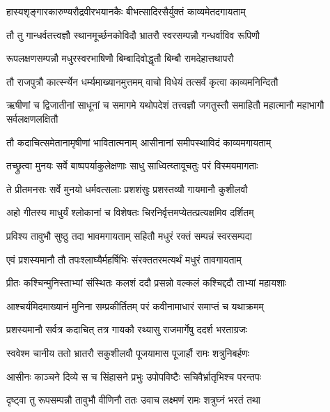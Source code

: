 \twolineshloka
{हास्यशृङ्गारकारुण्यरौद्रवीरभयानकैः}
{बीभत्सादिरसैर्युक्तं काव्यमेतदगायताम्} %

\twolineshloka
{तौ तु गान्धर्वतत्त्वज्ञौ स्थानमूर्च्छनकोविदौ}
{भ्रातरौ स्वरसम्पन्नौ गन्धर्वाविव रूपिणौ} %

\twolineshloka
{रूपलक्षणसम्पन्नौ मधुरस्वरभाषिणौ}
{बिम्बादिवोद्धृतौ बिम्बौ रामदेहात्तथापरौ} %

\twolineshloka
{तौ राजपुत्रौ कार्त्स्न्येन धर्म्यमाख्यानमुत्तमम्}
{वाचो विधेयं तत्सर्वं कृत्वा काव्यमनिन्दितौ} %

\threelineshloka
{ऋषीणां च द्विजातीनां साधूनां च समागमे}
{यथोपदेशं तत्त्वज्ञौ जगतुस्तौ समाहितौ}
{महात्मानौ महाभागौ सर्वलक्षणलक्षितौ} %

\twolineshloka
{तौ कदाचित्समेतानामृषीणां भावितात्मनाम्}
{आसीनानां समीपस्थाविदं काव्यमगायताम्} %

\twolineshloka
{तच्छ्रुत्वा मुनयः सर्वे बाष्पपर्याकुलेक्षणाः}
{साधु साध्वित्य्तावूचतुः परं विस्मयमागताः} %

\twolineshloka
{ते प्रीतमनसः सर्वे मुनयो धर्मवत्सलाः}
{प्रशशंसुः प्रशस्तव्यौ गायमानौ कुशीलवौ} %

\twolineshloka
{अहो गीतस्य माधुर्यं श्लोकानां च विशेषतः}
{चिरनिर्वृत्तमप्येतत्प्रत्यक्षमिव दर्शितम्} %

\twolineshloka
{प्रविश्य तावुभौ सुष्ठु तदा भावमगायताम्}
{सहितौ मधुरं रक्तं सम्पन्नं स्वरसम्पदा} %

\twolineshloka
{एवं प्रशस्यमानौ तौ तपःश्लाघ्यैर्महर्षिभिः}
{संरक्ततरमत्यर्थं मधुरं तावगायताम्} %

\twolineshloka
{प्रीतः कश्चिन्मुनिस्ताभ्यां संस्थितः कलशं ददौ}
{प्रसन्नो वल्कलं कश्चिद्ददौ ताभ्यां महायशाः} %

\twolineshloka
{आश्चर्यमिदमाख्यानं मुनिना सम्प्रकीर्तितम्}
{परं कवीनामाधारं समाप्तं च यथाक्रमम्} %

\twolineshloka
{प्रशस्यमानौ सर्वत्र कदाचित् तत्र गायकौ}
{रथ्यासु राजमार्गेषु ददर्श भरताग्रजः} %

\twolineshloka
{स्ववेश्म चानीय ततो भ्रातरौ सकुशीलवौ}
{पूजयामास पूजार्हौ रामः शत्रुनिबर्हणः} %

\twolineshloka
{आसीनः काञ्चने दिव्ये स च सिंहासने प्रभुः}
{उपोपविष्टैः सचिवैर्भ्रातृभिश्च परन्तपः} %

\twolineshloka
{दृष्ट्वा तु रूपसम्पन्नौ तावुभौ वीणिनौ ततः}
{उवाच लक्ष्मणं रामः शत्रुघ्नं भरतं तथा} %

